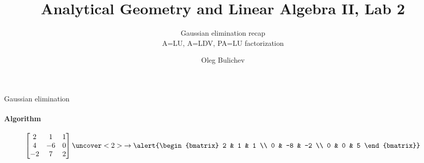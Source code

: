 \documentclass[aspectratio=169]{beamer}
\title[AGLA2]{Analytical Geometry and Linear Algebra II, Lab 2} %
\subtitle{Gaussian elimination recap\\
          A=LU, A=LDV, PA=LU factorization} %
\author{Oleg Bulichev}
\newcommand{\fbckg}[1]{\usebackgroundtemplate{\texttt{[image: \#1]}}}%
\begin{document}
\fbckg{fibeamer/figs/title_page.png}

\fbckg{fibeamer/figs/common.png}



\begin{frame}[t]{Gaussian elimination}
\framesubtitle{Algorithm}
    \Large
    \begin{equation*}
        \begin{bmatrix}
        2 & 1 & 1 \\
        4 & -6 & 0 \\
        -2 & 7  & 2 
        \end{bmatrix}
        \uncover<2>{\rightarrow \alert{\begin{bmatrix}
        2 & 1 & 1 \\
        0 & -8 & -2 \\ 
        0 & 0  & 5 
        \end{bmatrix}}}
    \end{equation*}
\end{frame}
\end{document}
